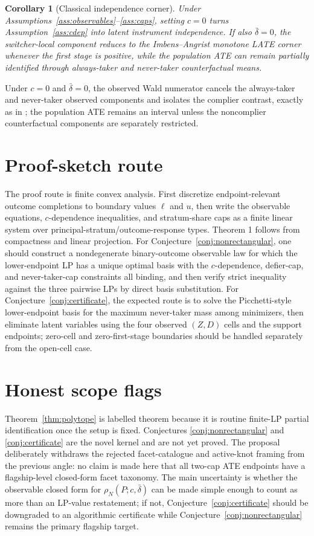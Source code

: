 \documentclass[11pt]{article}
\theoremstyle{definition}
\theoremstyle{plain}
\newtheorem{corollary}{Corollary}
\theoremstyle{remark}
\begin{document}
\begin{corollary}[Classical independence corner]\label{cor:independence}
Under Assumptions~\ref{ass:observables}--\ref{ass:caps}, setting \(c=0\)
turns Assumption~\ref{ass:cdep} into latent instrument independence.  If also
\(\bar\delta=0\), the switcher-local component reduces to the
Imbens--Angrist monotone LATE corner whenever the first stage is positive,
while the population ATE can remain partially identified through always-taker
and never-taker counterfactual means.
\end{corollary}

Under \(c=0\) and \(\bar\delta=0\), the observed Wald numerator cancels the
always-taker and never-taker observed components and isolates the complier
contrast, exactly as in \citet{ImbensAngrist1994}; the population ATE remains
an interval unless the noncomplier counterfactual components are separately
restricted.

\section{Proof-sketch route}
The proof route is finite convex analysis.  First discretize endpoint-relevant
outcome completions to boundary values \(\ell\) and \(u\), then write the
observable equations, \(c\)-dependence inequalities, and stratum-share caps as
a finite linear system over principal-stratum/outcome-response types.  Theorem
1 follows from compactness and linear projection.  For
Conjecture~\ref{conj:nonrectangular}, one should construct a nondegenerate
binary-outcome observable law for which the lower-endpoint LP has a unique
optimal basis with the \(c\)-dependence, defier-cap, and never-taker-cap
constraints all binding, and then verify strict inequality against the three
pairwise LPs by direct basis substitution.  For
Conjecture~\ref{conj:certificate}, the expected route is to solve the
Picchetti-style lower-endpoint basis for the maximum never-taker mass among
minimizers, then eliminate latent variables using the four observed
\((Z,D)\) cells and the support endpoints; zero-cell and zero-first-stage
boundaries should be handled separately from the open-cell case.

\section{Honest scope flags}
Theorem~\ref{thm:polytope} is labelled theorem because it is routine finite-LP
partial identification once the setup is fixed.  Conjectures
\ref{conj:nonrectangular} and \ref{conj:certificate} are the novel kernel and
are not yet proved.  The proposal deliberately withdraws the rejected
facet-catalogue and active-knot framing from the previous angle: no claim is
made here that all two-cap ATE endpoints have a flagship-level closed-form
facet taxonomy.  The main uncertainty is whether the observable closed form
for \(\rho_N(P;c,\bar\delta)\) can be made simple enough to count as more than
an LP-value restatement; if not, Conjecture~\ref{conj:certificate} should be
downgraded to an algorithmic certificate while Conjecture~\ref{conj:nonrectangular}
remains the primary flagship target.
\end{document}
